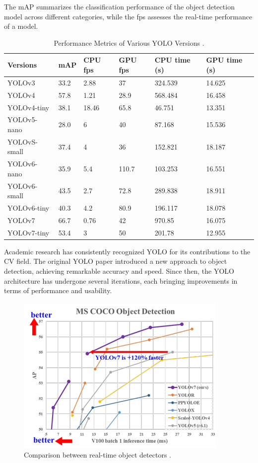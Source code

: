 The mAP summarizes the classification performance of the object detection model across different categories, while the fps assesses the real-time performance of a model.

\begin{table}[H]
    \caption[Performance Metrics of Various YOLO Versions]{Performance Metrics of Various YOLO Versions \cite{YOLO_compare}.}
    \label{tab:yolo_performance}
    \centering
    \begin{tabular}{|l|l|l|l|l|l|}
        \hline
        Versions & mAP & CPU fps & GPU fps & CPU time (s) & GPU time (s) \\ \hline
        YOLOv3 & 33.2 & 2.88 & 37 & 324.539 & 14.625 \\
        YOLOv4 & 57.8 & 1.21 & 28.9 & 568.484 & 16.458 \\
        YOLOv4-tiny & 38.1 & 18.46 & 65.8 & 46.751 & 13.351 \\
        YOLOv5-nano & 28.0 & 6 & 40 & 87.168 & 15.536 \\
        YOLOvS-small & 37.4 & 4 & 36 & 152.821 & 18.187 \\
        YOLOv6-nano & 35.9 & 5.4 & 110.7 & 103.253 & 16.551 \\
        YOLOv6-small & 43.5 & 2.7 & 72.8 & 289.838 & 18.911 \\
        YOLOv6-tiny & 40.3 & 4.2 & 80.9 & 196.117 & 18.078 \\
        YOLOv7 & 66.7 & 0.76 & 42 & 970.85 & 16.075 \\
        YOLOv7-tiny & 53.4 & 3 & 50 & 201.78 & 12.955 \\ \hline
    \end{tabular}
\end{table}


Academic research has consistently recognized YOLO for its contributions to the CV field. The original YOLO paper \cite{YOLO} introduced a new approach to object detection, achieving remarkable accuracy and speed. Since then, the YOLO architecture has undergone several iterations, each bringing improvements in terms of performance and usability.

\begin{figure}[H]
    \centering
    \includegraphics[width=0.6\linewidth]{figures/yolov7.png}
    \caption[Comparison between real-time object detectors]{Comparison between real-time object detectors \cite{yolov7}.}
    \label{fig:yolov7}
\end{figure}

